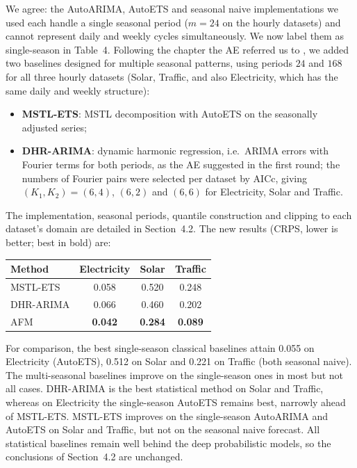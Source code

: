 \documentclass[11pt]{article}
\newcommand{\authorresponse}[1]{%
    #1\par\medskip
}
\begin{document}
\authorresponse{%
We agree: the AutoARIMA, AutoETS and seasonal naive implementations we used each handle a single seasonal period ($m=24$ on the hourly datasets) and cannot represent daily and weekly cycles simultaneously. We now label them as single-season in Table~4. Following the chapter the AE referred us to \citep{hyndman2025fpppy}, we added two baselines designed for multiple seasonal patterns, using periods $24$ and $168$ for all three hourly datasets (Solar, Traffic, and also Electricity, which has the same daily and weekly structure):
\begin{itemize}[nosep]
  \item \textbf{MSTL-ETS}: MSTL decomposition \citep{bandara2025mstl} with AutoETS on the seasonally adjusted series;
  \item \textbf{DHR-ARIMA}: dynamic harmonic regression, i.e.\ ARIMA errors with Fourier terms for both periods, as the AE suggested in the first round; the numbers of Fourier pairs were selected per dataset by AICc, giving $(K_1, K_2) = (6, 4)$, $(6, 2)$ and $(6, 6)$ for Electricity, Solar and Traffic.
\end{itemize}
The implementation, seasonal periods, quantile construction and clipping to each dataset's domain are detailed in Section~4.2. The new results (CRPS, lower is better; best in bold) are:

\begin{center}
\begin{tabular}{lccc}
\hline
Method & Electricity & Solar & Traffic \\
\hline
MSTL-ETS  & 0.058 & 0.520 & 0.248 \\
DHR-ARIMA & 0.066 & 0.460 & 0.202 \\
AFM       & \textbf{0.042} & \textbf{0.284} & \textbf{0.089} \\
\hline
\end{tabular}
\end{center}
For comparison, the best single-season classical baselines attain 0.055 on Electricity (AutoETS), 0.512 on Solar and 0.221 on Traffic (both seasonal naive). The multi-seasonal baselines improve on the single-season ones in most but not all cases. DHR-ARIMA is the best statistical method on Solar and Traffic, whereas on Electricity the single-season AutoETS remains best, narrowly ahead of MSTL-ETS. MSTL-ETS improves on the single-season AutoARIMA and AutoETS on Solar and Traffic, but not on the seasonal naive forecast. All statistical baselines remain well behind the deep probabilistic models, so the conclusions of Section~4.2 are unchanged.
}
\end{document}
